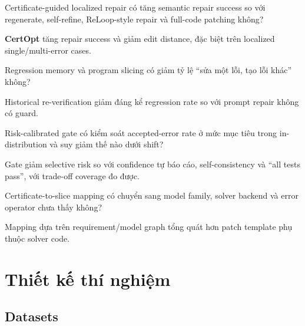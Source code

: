 \documentclass[11pt,a4paper]{article}
\newcommand{\method}{\textsf{\textbf{CertOpt}}\xspace}
\begin{document}
\begin{description}[leftmargin=1.8em,labelindent=0em,labelsep=0.5em,style=nextline]
  \item[\textbf{RQ1 -- Repair efficacy.}]
  Certificate-guided localized repair có tăng semantic repair success so với regenerate, self-refine, ReLoop-style repair và full-code patching không?

  \item[\textbf{H1.}]
  \method tăng repair success và giảm edit distance, đặc biệt trên localized single/multi-error cases.

  \item[\textbf{RQ2 -- Non-regression.}]
  Regression memory và program slicing có giảm tỷ lệ ``sửa một lỗi, tạo lỗi khác'' không?

  \item[\textbf{H2.}]
  Historical re-verification giảm đáng kể regression rate so với prompt repair không có guard.

  \item[\textbf{RQ3 -- Selective reliability.}]
  Risk-calibrated gate có kiểm soát accepted-error rate ở mức mục tiêu trong in-distribution và suy giảm thế nào dưới shift?

  \item[\textbf{H3.}]
  Gate giảm selective risk so với confidence tự báo cáo, self-consistency và ``all tests pass'', với trade-off coverage đo được.

  \item[\textbf{RQ4 -- Generalization.}]
  Certificate-to-slice mapping có chuyển sang model family, solver backend và error operator chưa thấy không?

  \item[\textbf{H4.}]
  Mapping dựa trên requirement/model graph tổng quát hơn patch template phụ thuộc solver code.
\end{description}

\section{Thiết kế thí nghiệm}

\subsection{Datasets}
\end{document}
